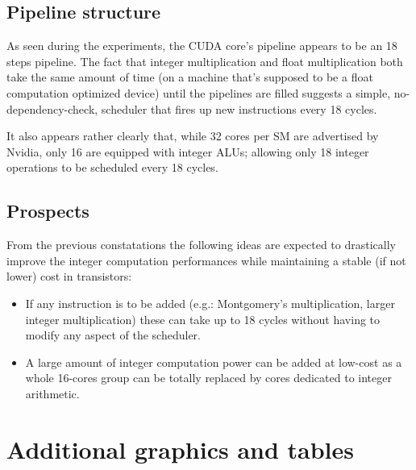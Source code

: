\documentclass{report}
\begin{document}
    \subsection{Pipeline structure}
    As seen during the experiments, the CUDA core's pipeline appears to be an
    18 steps pipeline. The fact that integer multiplication and 
    float multiplication both take the same amount
    of time (on a machine that's supposed to be a float computation
    optimized device) until the pipelines are filled suggests a simple,
    no-dependency-check, scheduler that fires up new instructions every 18 cycles.

    It also appears rather clearly that, while 32 cores per SM are advertised by
    Nvidia, only 16 are equipped with integer ALUs; allowing only 18 integer
    operations to be scheduled every 18 cycles.
    
    \subsection{Prospects}
    From the previous constatations the following ideas are expected to drastically
    improve the integer computation performances while maintaining a stable (if not
    lower) cost in transistors:
    \begin{itemize}
        \item If any instruction is to be added (e.g.: Montgomery's multiplication, larger integer multiplication) these can take up to 18 cycles without having to modify any aspect of the scheduler.
        \item A large amount of integer computation power can be added at low-cost as a whole 16-cores group can be totally replaced by cores dedicated to integer arithmetic.
    \end{itemize}
\section{Additional graphics and tables}
\end{document}
